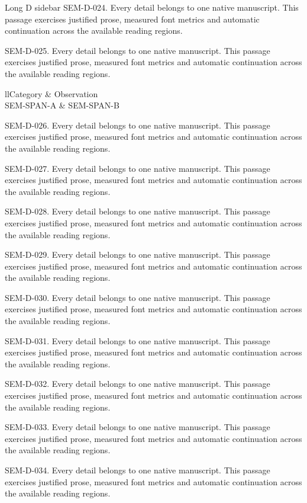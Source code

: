 \begin{m20sidebarwide}[columns=2,id=long-wide2]{Long D sidebar}
SEM-D-024. Every detail belongs to one native manuscript. This passage exercises justified prose, measured font metrics and automatic continuation across the available reading regions.\par
SEM-D-025. Every detail belongs to one native manuscript. This passage exercises justified prose, measured font metrics and automatic continuation across the available reading regions.\par
\begin{m20table}[id=span-table,head-rows=1]{ll}Category & Observation \\ SEM-SPAN-A & SEM-SPAN-B \\ \end{m20table}
SEM-D-026. Every detail belongs to one native manuscript. This passage exercises justified prose, measured font metrics and automatic continuation across the available reading regions.\par
SEM-D-027. Every detail belongs to one native manuscript. This passage exercises justified prose, measured font metrics and automatic continuation across the available reading regions.\par
SEM-D-028. Every detail belongs to one native manuscript. This passage exercises justified prose, measured font metrics and automatic continuation across the available reading regions.\par
SEM-D-029. Every detail belongs to one native manuscript. This passage exercises justified prose, measured font metrics and automatic continuation across the available reading regions.\par
SEM-D-030. Every detail belongs to one native manuscript. This passage exercises justified prose, measured font metrics and automatic continuation across the available reading regions.\par
SEM-D-031. Every detail belongs to one native manuscript. This passage exercises justified prose, measured font metrics and automatic continuation across the available reading regions.\par
SEM-D-032. Every detail belongs to one native manuscript. This passage exercises justified prose, measured font metrics and automatic continuation across the available reading regions.\par
SEM-D-033. Every detail belongs to one native manuscript. This passage exercises justified prose, measured font metrics and automatic continuation across the available reading regions.\par
SEM-D-034. Every detail belongs to one native manuscript. This passage exercises justified prose, measured font metrics and automatic continuation across the available reading regions.\par

\end{m20sidebarwide}
